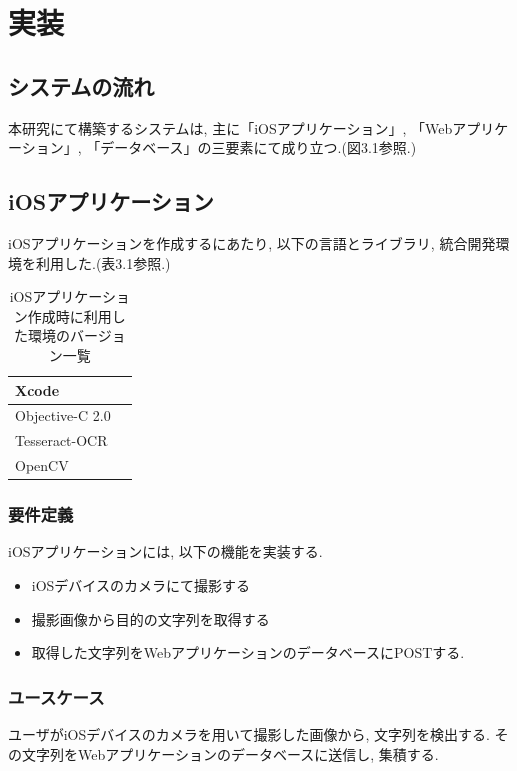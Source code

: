 \chapter{実装}
\label{chap:poordirection}

\section{システムの流れ}
本研究にて構築するシステムは, 主に「iOSアプリケーション」, 「Webアプリケーション」, 「データベース」の三要素にて成り立つ.(図3.1参照.)

\section{iOSアプリケーション}
iOSアプリケーションを作成するにあたり, 以下の言語とライブラリ, 統合開発環境を利用した.(表3.1参照.)

\begin{table}
\begin{center}
\begin{tabular}{|l|l|} \hline
Xcode &  \\ \hline
Objective-C 2.0 & \\ \hline
Tesseract-OCR & \\ \hline
OpenCV & \\ \hline
\end{tabular}
\end{center}
\caption{iOSアプリケーション作成時に利用した環境のバージョン一覧}
\end{table}

\subsection{要件定義}
iOSアプリケーションには, 以下の機能を実装する.
\begin{itemize}
\item iOSデバイスのカメラにて撮影する

\item 撮影画像から目的の文字列を取得する

\item 取得した文字列をWebアプリケーションのデータベースにPOSTする.
\end{itemize}

\subsection{ユースケース}
ユーザがiOSデバイスのカメラを用いて撮影した画像から, 文字列を検出する.
その文字列をWebアプリケーションのデータベースに送信し, 集積する.

